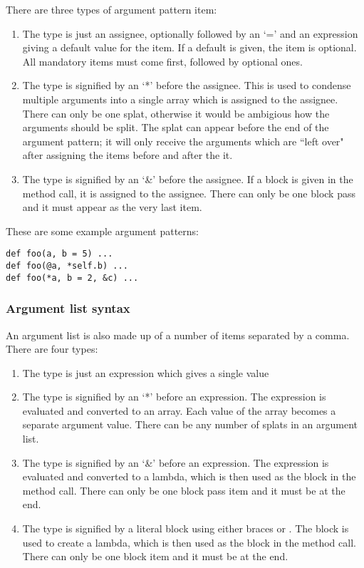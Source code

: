 There are three types of argument pattern item:

\begin{enumerate}
  \item The  type is just an assignee, optionally followed by an `=' and an expression giving a default value for the item. If a default is given, the item is optional. All mandatory items must come first, followed by optional ones.
  
  \item The  type is signified by an `*' before the assignee. This is used to condense multiple arguments into a single array which is assigned to the assignee. There can only be one splat, otherwise it would be ambigious how the arguments should be split. The splat can appear before the end of the argument pattern; it will only receive the arguments which are ``left over" after assigning the items before and after the it.
  
  \item The  type is signified by an `\&' before the assignee. If a block is given in the method call, it is assigned to the assignee. There can only be one block pass and it must appear as the very last item.
\end{enumerate}

These are some example argument patterns:

\begin{lstlisting}
def foo(a, b = 5) ...
def foo(@a, *self.b) ...
def foo(*a, b = 2, &c) ...
\end{lstlisting}

\subsubsection{Argument list syntax}

An argument list is also made up of a number of items separated by a comma. There are four types:

\begin{enumerate}
  \item The  type is just an expression which gives a single value
  \item The  type is signified by an `*' before an expression. The expression is evaluated and converted to an array. Each value of the array becomes a separate argument value. There can be any number of splats in an argument list.
  \item The  type is signified by an `\&' before an expression. The expression is evaluated and converted to a lambda, which is then used as the block in the method call. There can only be one block pass item and it must be at the end.
  \item The  type is signified by a literal block using either braces or   . The block is used to create a lambda, which is then used as the block in the method call. There can only be one block item and it must be at the end.
\end{enumerate}

